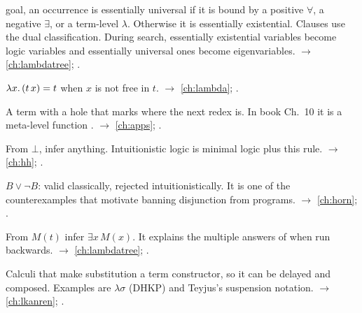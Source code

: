 \begin{glossarylist}
  goal, an occurrence is essentially universal if it is bound by a positive $\forall$, a negative $\exists$, or a
  term-level $\lambda$. Otherwise it is essentially existential. Clauses use the dual classification. During search,
  essentially existential variables become logic variables and essentially universal ones become eigenvariables.
  $\rightarrow$ \cref{ch:lambdatree}; .
\item[$\eta$-conversion] $\lambda x.\,(t\,x) = t$ when $x$ is not free in $t$. $\rightarrow$ \cref{ch:lambda};
  .
\item[Evaluation context] A term with a hole that marks where the next redex is. In book Ch.~10 it is a meta-level
  function . $\rightarrow$ \cref{ch:apps}; .
\item[Ex falso quodlibet] From $\bot$, infer anything. Intuitionistic logic is minimal logic plus this rule.
  $\rightarrow$ \cref{ch:hh}; .
\item[Excluded middle] $B\vee\neg B$: valid classically, rejected intuitionistically. It is one of the
  counterexamples that motivate banning disjunction from programs. $\rightarrow$ \cref{ch:horn}; .
\item[Existential generalisation] From $M(t)$ infer $\exists x\,M(x)$. It explains the multiple answers of
   when run backwards. $\rightarrow$ \cref{ch:lambdatree}; .
\item[Explicit substitution] Calculi that make substitution a term constructor, so it can be delayed and composed.
  Examples are $\lambda\sigma$ (DHKP) and Teyjus's suspension notation. $\rightarrow$ \cref{ch:lkanren};
  .
\end{glossarylist}

